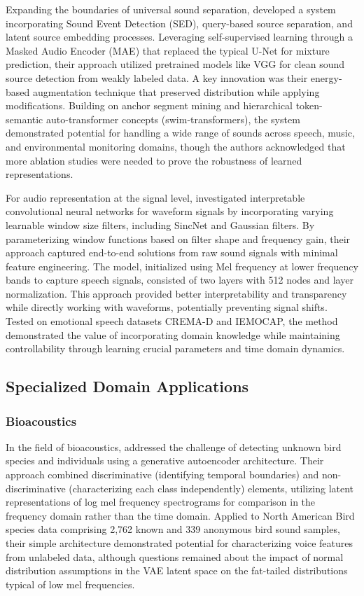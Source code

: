 \documentclass[11pt]{article}
\begin{document}
Expanding the boundaries of universal sound separation, \citep{zhao2024universalsoundseparationselfsupervised} developed a system incorporating Sound Event Detection (SED), query-based source separation, and latent source embedding processes. Leveraging self-supervised learning through a Masked Audio Encoder (MAE) that replaced the typical U-Net for mixture prediction, their approach utilized pretrained models like VGG for clean sound source detection from weakly labeled data. A key innovation was their energy-based augmentation technique that preserved distribution while applying modifications. Building on anchor segment mining and hierarchical token-semantic auto-transformer concepts (swim-transformers), the system demonstrated potential for handling a wide range of sounds across speech, music, and environmental monitoring domains, though the authors acknowledged that more ablation studies were needed to prove the robustness of learned representations.

For audio representation at the signal level, \citep{vu2024endtoendinterpretableconvolutionalneural} investigated interpretable convolutional neural networks for waveform signals by incorporating varying learnable window size filters, including SincNet and Gaussian filters. By parameterizing window functions based on filter shape and frequency gain, their approach captured end-to-end solutions from raw sound signals with minimal feature engineering. The model, initialized using Mel frequency at lower frequency bands to capture speech signals, consisted of two layers with 512 nodes and layer normalization. This approach provided better interpretability and transparency while directly working with waveforms, potentially preventing signal shifts. Tested on emotional speech datasets CREMA-D and IEMOCAP, the method demonstrated the value of incorporating domain knowledge while maintaining controllability through learning crucial parameters and time domain dynamics.

\subsection{Specialized Domain Applications}

\subsubsection{Bioacoustics}
In the field of bioacoustics, \citep{https://doi.org/10.1049/cit2.12007} addressed the challenge of detecting unknown bird species and individuals using a generative autoencoder architecture. Their approach combined discriminative (identifying temporal boundaries) and non-discriminative (characterizing each class independently) elements, utilizing latent representations of log mel frequency spectrograms for comparison in the frequency domain rather than the time domain. Applied to North American Bird species data comprising 2,762 known and 339 anonymous bird sound samples, their simple architecture demonstrated potential for characterizing voice features from unlabeled data, although questions remained about the impact of normal distribution assumptions in the VAE latent space on the fat-tailed distributions typical of low mel frequencies. 
\end{document}
